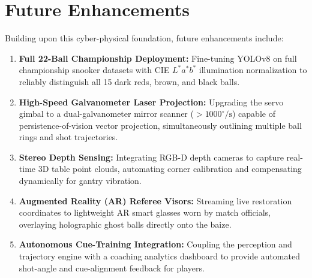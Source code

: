 \section{Future Enhancements}
Building upon this cyber-physical foundation, future enhancements include:
\begin{enumerate}
    \item \textbf{Full 22-Ball Championship Deployment:} Fine-tuning YOLOv8 on full championship snooker datasets with CIE $L^*a^*b^*$ illumination normalization to reliably distinguish all 15 dark reds, brown, and black balls.
    \item \textbf{High-Speed Galvanometer Laser Projection:} Upgrading the servo gimbal to a dual-galvanometer mirror scanner ($>1000^\circ/\text{s}$) capable of persistence-of-vision vector projection, simultaneously outlining multiple ball rings and shot trajectories.
    \item \textbf{Stereo Depth Sensing:} Integrating RGB-D depth cameras to capture real-time 3D table point clouds, automating corner calibration and compensating dynamically for gantry vibration.
    \item \textbf{Augmented Reality (AR) Referee Visors:} Streaming live restoration coordinates to lightweight AR smart glasses worn by match officials, overlaying holographic ghost balls directly onto the baize.
    \item \textbf{Autonomous Cue-Training Integration:} Coupling the perception and trajectory engine with a coaching analytics dashboard to provide automated shot-angle and cue-alignment feedback for players.
\end{enumerate}
